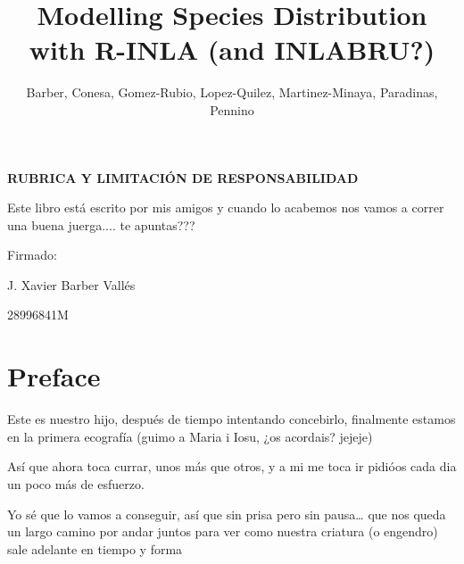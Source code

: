 \documentclass[
]{krantz}
\title{Modelling Species Distribution\\
with R-INLA (and INLABRU?)\\}
\author{Barber, Conesa, Gomez-Rubio, Lopez-Quilez, Martinez-Minaya, Paradinas, Pennino}
\date{}
\begin{document}
\maketitle



\linespread{1.4}

\normalsize

\textbf{RUBRICA Y LIMITACIÓN DE RESPONSABILIDAD}

Este libro está escrito por mis amigos y cuando lo acabemos nos vamos a correr una buena juerga.... te apuntas???

\vspace{5cm}

\hspace{5cm} Firmado:

\vspace{0.35cm}

\hspace{7cm} J. Xavier Barber Vallés

\hspace{7cm} 28996841M

\setlength{\abovedisplayskip}{-5pt}
\setlength{\abovedisplayshortskip}{-5pt}

{
\setcounter{tocdepth}{2}
\tableofcontents
}
\listoffigures
\listoftables
\newpage

\hypertarget{preface}{%
\chapter*{Preface}\label{preface}}


Este es nuestro hijo, después de tiempo intentando concebirlo, finalmente estamos en la primera ecografía (guimo a Maria i Iosu, ¿os acordais? jejeje)

Así que ahora toca currar, unos más que otros, y a mi me toca ir pidióos cada dia un poco más de esfuerzo.

Yo sé que lo vamos a conseguir, así que sin prisa pero sin pausa\ldots{} que nos queda un largo camino por andar juntos para ver como nuestra criatura (o engendro) sale adelante en tiempo y forma

\pagebreak 
\setcounter{chapter}{1}
\setcounter{section}{0}
\setcounter{page}{0}
\renewcommand{\thepage}{\arabic{page}}
\end{document}
